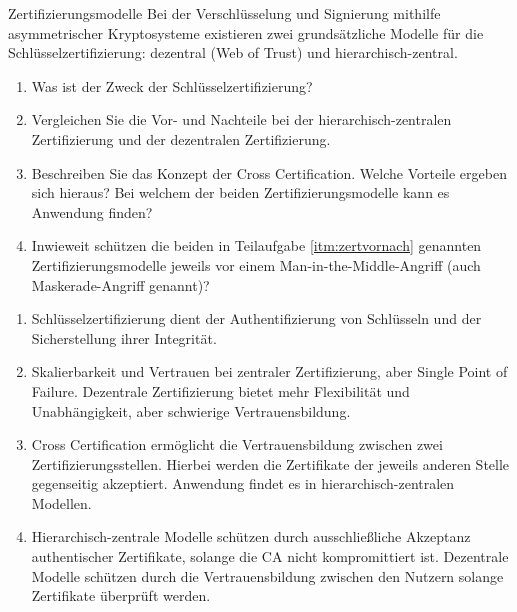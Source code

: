 \documentclass{article}
\begin{document}
\begin{exercise}{Zertifizierungsmodelle}
  Bei der Verschlüsselung und Signierung mithilfe asymmetrischer Kryptosysteme existieren zwei grundsätzliche Modelle für die Schlüsselzertifizierung: dezentral (Web of Trust) und hierarchisch-zentral.
  \begin{enumerate}
    \item Was ist der Zweck der Schlüsselzertifizierung?
    \item\label{itm:zertvornach} Vergleichen Sie die Vor- und Nachteile bei der hierarchisch-zentralen Zertifizierung und der dezentralen Zertifizierung.
    \item Beschreiben Sie das Konzept der Cross Certification. Welche Vorteile ergeben sich hieraus? Bei welchem der beiden Zertifizierungsmodelle kann es Anwendung finden?
    \item Inwieweit schützen die beiden in Teilaufgabe \ref{itm:zertvornach} genannten Zertifizierungsmodelle jeweils vor einem Man-in-the-Middle-Angriff (auch Maskerade-Angriff genannt)?
  \end{enumerate}

  \begin{solution}
    \begin{enumerate}
      \item Schlüsselzertifizierung dient der Authentifizierung von Schlüsseln und der Sicherstellung ihrer Integrität.
      \item Skalierbarkeit und Vertrauen bei zentraler Zertifizierung, aber Single Point of Failure. Dezentrale Zertifizierung bietet mehr Flexibilität und Unabhängigkeit, aber schwierige Vertrauensbildung.
      \item Cross Certification ermöglicht die Vertrauensbildung zwischen zwei Zertifizierungsstellen. Hierbei werden die Zertifikate der jeweils anderen Stelle gegenseitig akzeptiert. Anwendung findet es in hierarchisch-zentralen Modellen.
      \item Hierarchisch-zentrale Modelle schützen durch ausschließliche Akzeptanz authentischer Zertifikate, solange die CA nicht kompromittiert ist. Dezentrale Modelle schützen durch die Vertrauensbildung zwischen den Nutzern solange Zertifikate überprüft werden.
    \end{enumerate}
  \end{solution}
\end{exercise}
\end{document}
